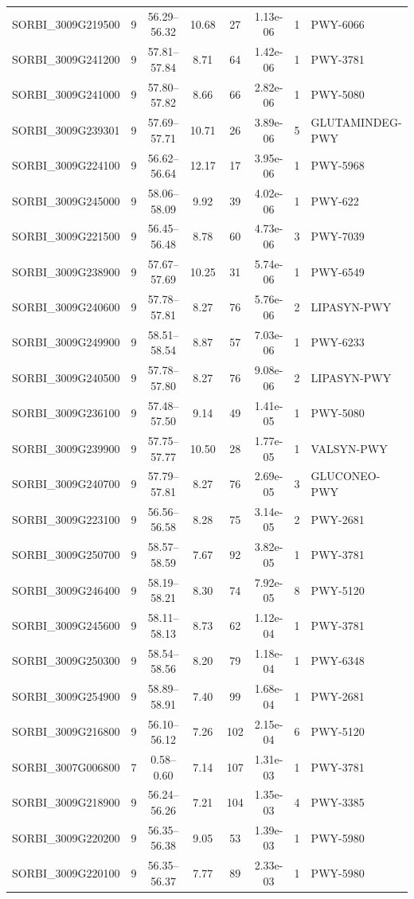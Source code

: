 \documentclass[11pt]{article}
\begin{document}
\begin{longtable}{@{}llcccccl@{}}
SORBI\_3009G219500 & 9 & 56.29--56.32 & 10.68 & 27 & 1.13e-06 & 1 & PWY-6066 \\
SORBI\_3009G241200 & 9 & 57.81--57.84 & 8.71 & 64 & 1.42e-06 & 1 & PWY-3781 \\
SORBI\_3009G241000 & 9 & 57.80--57.82 & 8.66 & 66 & 2.82e-06 & 1 & PWY-5080 \\
SORBI\_3009G239301 & 9 & 57.69--57.71 & 10.71 & 26 & 3.89e-06 & 5 & GLUTAMINDEG-PWY \\
SORBI\_3009G224100 & 9 & 56.62--56.64 & 12.17 & 17 & 3.95e-06 & 1 & PWY-5968 \\
SORBI\_3009G245000 & 9 & 58.06--58.09 & 9.92 & 39 & 4.02e-06 & 1 & PWY-622 \\
SORBI\_3009G221500 & 9 & 56.45--56.48 & 8.78 & 60 & 4.73e-06 & 3 & PWY-7039 \\
SORBI\_3009G238900 & 9 & 57.67--57.69 & 10.25 & 31 & 5.74e-06 & 1 & PWY-6549 \\
SORBI\_3009G240600 & 9 & 57.78--57.81 & 8.27 & 76 & 5.76e-06 & 2 & LIPASYN-PWY \\
SORBI\_3009G249900 & 9 & 58.51--58.54 & 8.87 & 57 & 7.03e-06 & 1 & PWY-6233 \\
SORBI\_3009G240500 & 9 & 57.78--57.80 & 8.27 & 76 & 9.08e-06 & 2 & LIPASYN-PWY \\
SORBI\_3009G236100 & 9 & 57.48--57.50 & 9.14 & 49 & 1.41e-05 & 1 & PWY-5080 \\
SORBI\_3009G239900 & 9 & 57.75--57.77 & 10.50 & 28 & 1.77e-05 & 1 & VALSYN-PWY \\
SORBI\_3009G240700 & 9 & 57.79--57.81 & 8.27 & 76 & 2.69e-05 & 3 & GLUCONEO-PWY \\
SORBI\_3009G223100 & 9 & 56.56--56.58 & 8.28 & 75 & 3.14e-05 & 2 & PWY-2681 \\
SORBI\_3009G250700 & 9 & 58.57--58.59 & 7.67 & 92 & 3.82e-05 & 1 & PWY-3781 \\
SORBI\_3009G246400 & 9 & 58.19--58.21 & 8.30 & 74 & 7.92e-05 & 8 & PWY-5120 \\
SORBI\_3009G245600 & 9 & 58.11--58.13 & 8.73 & 62 & 1.12e-04 & 1 & PWY-3781 \\
SORBI\_3009G250300 & 9 & 58.54--58.56 & 8.20 & 79 & 1.18e-04 & 1 & PWY-6348 \\
SORBI\_3009G254900 & 9 & 58.89--58.91 & 7.40 & 99 & 1.68e-04 & 1 & PWY-2681 \\
SORBI\_3009G216800 & 9 & 56.10--56.12 & 7.26 & 102 & 2.15e-04 & 6 & PWY-5120 \\
SORBI\_3007G006800 & 7 & 0.58--0.60 & 7.14 & 107 & 1.31e-03 & 1 & PWY-3781 \\
SORBI\_3009G218900 & 9 & 56.24--56.26 & 7.21 & 104 & 1.35e-03 & 4 & PWY-3385 \\
SORBI\_3009G220200 & 9 & 56.35--56.38 & 9.05 & 53 & 1.39e-03 & 1 & PWY-5980 \\
SORBI\_3009G220100 & 9 & 56.35--56.37 & 7.77 & 89 & 2.33e-03 & 1 & PWY-5980 \\
\end{longtable}
\end{document}
